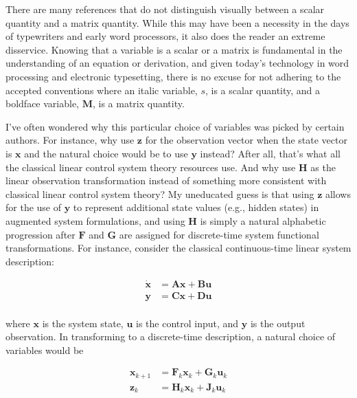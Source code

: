\documentclass[12pt]{article}
\begin{document}
There are many references that do not distinguish visually between a scalar quantity and
a matrix quantity. While this may have been a necessity in the days of typewriters and
early word processors, it also does the reader an extreme disservice. Knowing that a
variable is a scalar or a matrix is fundamental in the understanding of an equation or
derivation, and given today’s technology in word processing and electronic typesetting,
there is no excuse for not adhering to the accepted conventions where an italic variable,
$s$, is a scalar quantity, and a boldface variable, $\mathbf{M}$, is a matrix quantity.

I’ve often wondered why this particular choice of variables was picked by certain authors.
For instance, why use $\mathbf{z}$ for the observation vector when the state vector is
$\mathbf{x}$ and the natural choice would be to use $\mathbf{y}$ instead? After all,
that’s what all the classical linear control system theory resources use. And why use
$\mathbf{H}$ as the linear observation transformation instead of something more consistent
with classical linear control system theory? My uneducated guess is that using $\mathbf{z}$
allows for the use of $\mathbf{y}$ to represent additional state values (e.g., hidden
states) in augmented system formulations, and using $\mathbf{H}$ is simply a natural
alphabetic progression after $\mathbf{F}$ and $\mathbf{G}$ are assigned for discrete-time
system functional transformations. For instance, consider the classical continuous-time
linear system description:

\begin{equation*}
    \begin{aligned}
        \mathbf{\dot{x}} &= \mathbf{A} \mathbf{x} + \mathbf{B} \mathbf{u} \\
        \mathbf{y} &= \mathbf{C} \mathbf{x} + \mathbf{D} \mathbf{u} \\
    \end{aligned}
\end{equation*}

where $\mathbf{x}$ is the system state, $\mathbf{u}$ is the control input, and $\mathbf{y}$
is the output observation. In transforming to a discrete-time description, a natural
choice of variables would be

\begin{equation*}
    \begin{aligned}
        \mathbf{x}_{k+1} &= \mathbf{F}_k \mathbf{x}_k + \mathbf{G}_k \mathbf{u}_k \\
        \mathbf{z}_k &= \mathbf{H}_k \mathbf{x}_k + \mathbf{J}_k \mathbf{u}_k
    \end{aligned}
\end{equation*}
\end{document}

